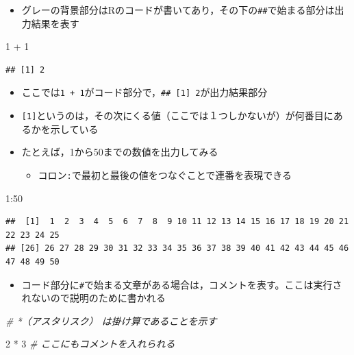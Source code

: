 \documentclass[
  xelatex,ja=standard, b5paper]{bxjsbook}
\newenvironment{Shaded}{\begin{snugshade}}{\end{snugshade}}
\newcommand{\CommentTok}[1]{\textcolor[rgb]{0.56,0.35,0.01}{\textit{#1}}}
\newcommand{\DecValTok}[1]{\textcolor[rgb]{0.00,0.00,0.81}{#1}}
\newcommand{\SpecialCharTok}[1]{\textcolor[rgb]{0.00,0.00,0.00}{#1}}
\providecommand{\tightlist}{%
  \setlength{\itemsep}{0pt}\setlength{\parskip}{0pt}}
\begin{document}
\begin{itemize}
\tightlist
\item
  グレーの背景部分はRのコードが書いてあり，その下の\texttt{\#\#}で始まる部分は出力結果を表す
\end{itemize}

\begin{Shaded}
\begin{Highlighting}[]
\DecValTok{1} \SpecialCharTok{+} \DecValTok{1}
\end{Highlighting}
\end{Shaded}

\begin{verbatim}
## [1] 2
\end{verbatim}

\begin{itemize}
\tightlist
\item
  ここでは\texttt{1\ +\ 1}がコード部分で，\texttt{\#\#\ {[}1{]}\ 2}が出力結果部分
\item
  \texttt{{[}1{]}}というのは，その次にくる値（ここでは１つしかないが）が何番目にあるかを示している
\item
  たとえば，1から50までの数値を出力してみる

  \begin{itemize}
  \tightlist
  \item
    コロン\texttt{:}で最初と最後の値をつなぐことで連番を表現できる
  \end{itemize}
\end{itemize}

\begin{Shaded}
\begin{Highlighting}[]
\DecValTok{1}\SpecialCharTok{:}\DecValTok{50}
\end{Highlighting}
\end{Shaded}

\begin{verbatim}
##  [1]  1  2  3  4  5  6  7  8  9 10 11 12 13 14 15 16 17 18 19 20 21 22 23 24 25
## [26] 26 27 28 29 30 31 32 33 34 35 36 37 38 39 40 41 42 43 44 45 46 47 48 49 50
\end{verbatim}

\begin{itemize}
\tightlist
\item
  コード部分に\texttt{\#}で始まる文章がある場合は，コメントを表す。ここは実行されないので説明のために書かれる
\end{itemize}

\begin{Shaded}
\begin{Highlighting}[]
\CommentTok{\# *（アスタリスク） は掛け算であることを示す}

\DecValTok{2} \SpecialCharTok{*} \DecValTok{3}  \CommentTok{\# ここにもコメントを入れられる}
\end{Highlighting}
\end{Shaded}
\end{document}
